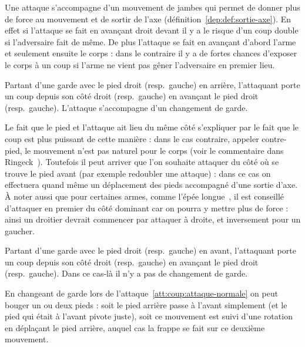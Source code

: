 
Une attaque s'accompagne d'un mouvement de jambes qui permet de donner plus de force au mouvement et de sortir de l'axe (définition~\ref{dep:def:sortie-axe}).
En effet si l'attaque se fait en avançant droit devant il y a le risque d'un coup double si l'adversaire fait de même.
De plus l'attaque se fait en avançant d'abord l'arme et seulement ensuite le corps : dans le contraire il y a de fortes chances d'exposer le corps à un coup si l'arme ne vient pas gêner l'adversaire en premier lieu.


\begin{coup}
	\label{att:coup:attaque-normale}

	Partant d'une garde avec le pied droit (resp.\ gauche) en arrière, l'attaquant porte un coup depuis son côté droit (resp.\ gauche) en avançant le pied droit (resp.\ gauche).
	L'attaque s'accompagne d'un changement de garde.
\end{coup}

Le fait que le pied et l'attaque ait lieu du même côté s'expliquer par le fait que le coup est plus puissant de cette manière : dans le cas contraire, appeler contre-pied, le mouvement n'est pas naturel pour le corps (voir le commentaire dans Ringeck~\cite[p.~7]{Ringeck:Farrell:2014:CodexRingeck}).
Toutefois il peut arriver que l'on souhaite attaquer du côté où se trouve le pied avant (par exemple redoubler une attaque) : dans ce cas on effectuera quand même un déplacement des pieds accompagné d'une sortie d'axe.
À noter aussi que pour certaines armes, comme l'épée longue~\cite[p.~10]{Ringeck:Farrell:2014:CodexRingeck}, il est conseillé d'attaquer en premier du côté dominant car on pourra y mettre plus de force : ainsi un droitier devrait commencer par attaquer à droite, et inversement pour un gaucher.


\begin{coup}
	\label{att:coup:attaque-même-côté}

	Partant d'une garde avec le pied droit (resp.\ gauche) en avant, l'attaquant porte un coup depuis son côté droit (resp.\ gauche) en avançant le pied droit (resp.\ gauche).
	Dans ce cas-là il n'y a pas de changement de garde.
\end{coup}


En changeant de garde lors de l'attaque~\ref{att:coup:attaque-normale} on peut bouger un ou deux pieds : soit le pied arrière passe à l'avant simplement (et le pied qui était à l'avant pivote juste), soit ce mouvement est suivi d'une rotation en déplaçant le pied arrière, auquel cas la frappe se fait sur ce deuxième mouvement.

